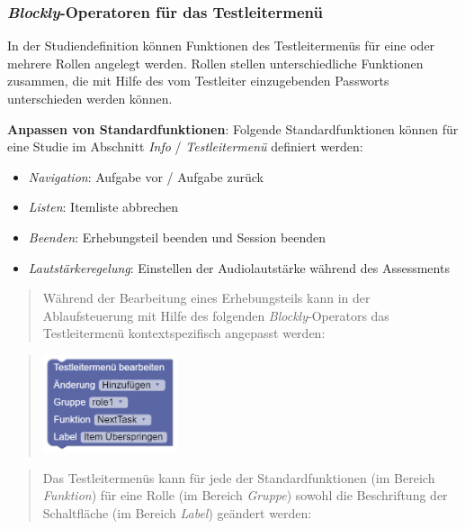 \documentclass[
  letterpaper,
  DIV=11]{scrreprt}
\providecommand{\tightlist}{%
  \setlength{\itemsep}{0pt}\setlength{\parskip}{0pt}}\usepackage{longtable,booktabs,array}
\begin{document}
\begin{tcolorbox}
\hypertarget{blockly-operatoren-fuxfcr-das-testleitermenuxfc-1}{%
\subsubsection{\texorpdfstring{\emph{Blockly}-Operatoren für das
Testleitermenü}{Blockly-Operatoren für das Testleitermenü}}\label{blockly-operatoren-fuxfcr-das-testleitermenuxfc-1}}

In der Studiendefinition können Funktionen des Testleitermenüs für eine
oder mehrere Rollen angelegt werden. Rollen stellen unterschiedliche
Funktionen zusammen, die mit Hilfe des vom Testleiter einzugebenden
Passworts unterschieden werden können.

\textbf{Anpassen von Standardfunktionen}: Folgende Standardfunktionen
können für eine Studie im Abschnitt \emph{Info} / \emph{Testleitermenü}
definiert werden:

\begin{itemize}
\tightlist
\item
  \emph{Navigation}: Aufgabe vor / Aufgabe zurück
\item
  \emph{Listen}: Itemliste abbrechen
\item
  \emph{Beenden}: Erhebungsteil beenden und Session beenden
\item
  \emph{Lautstärkeregelung}: Einstellen der Audiolautstärke während des
  Assessments
\end{itemize}

\begin{quote}
Während der Bearbeitung eines Erhebungsteils kann in der Ablaufsteuerung
mit Hilfe des folgenden \emph{Blockly}-Operators das Testleitermenü
kontextspezifisch angepasst werden:
\end{quote}

\begin{quote}
\includegraphics[width=1.5625in,height=\textheight]{img/screenshot-blockly-element-for-testadminstrator-menu-example-01-DEU.png}
\end{quote}

\begin{quote}
Das Testleitermenüs kann für jede der Standardfunktionen (im Bereich
\emph{Funktion}) für eine Rolle (im Bereich \emph{Gruppe}) sowohl die
Beschriftung der Schaltfläche (im Bereich \emph{Label}) geändert werden:
\end{quote}


\end{tcolorbox}
\end{document}
